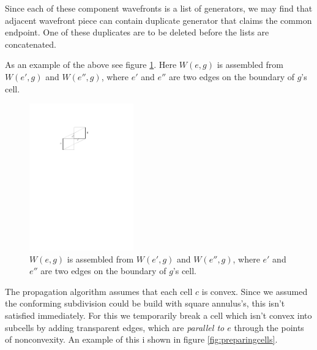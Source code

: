 Since each of these component wavefronts is a list of generators, we may find that adjacent wavefront 
piece can contain duplicate generator that claims the common endpoint. One of these duplicates are to be 
deleted before the lists are concatenated.

As an example of the above see figure \ref{fig:weg}. Here $W(e,g)$ is assembled from $W(e',g)$ and 
$W(e'',g)$, where $e'$ and $e''$ are two edges on the boundary of $g$'s cell.

\begin{figure}[H]
	\centering
	\includegraphics[width=0.4\textwidth]{figures/weg.pdf}
	\caption{$W(e,g)$ is assembled from $W(e',g)$ and $W(e'',g)$, where $e'$ and $e''$ are two edges on 
    		 the boundary of $g$'s cell\cite{HershbergerS99}.}
	\label{fig:weg}
\end{figure}

The propagation algorithm assumes that each cell $c$ is convex. Since we assumed the 
conforming subdivision could be build with square annulus's, this isn't satisfied immediately. For this we 
temporarily break a cell which isn't convex into subcells by adding transparent edges, which are 
\textit{parallel to $e$} through the points of nonconvexity. An example of this i shown in figure 
\ref{fig:preparingcells}.

